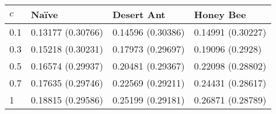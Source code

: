 \begin{tabular} {|l|l|l|l|}
\hline
$c$ & Na\"ive & Desert Ant & Honey Bee \\
\hline
0.1 & 0.13177 (0.30766) & 0.14596 (0.30386)  & 0.14991 (0.30227)    \\
0.3 & 0.15218 (0.30231) & 0.17973 (0.29697)  & 0.19096 (0.2928)     \\
0.5 & 0.16574 (0.29937) & 0.20481 (0.29367)  & 0.22098 (0.28802)    \\
0.7 & 0.17635 (0.29746) & 0.22569 (0.29211)  & 0.24431 (0.28617)    \\
1   & 0.18815 (0.29586) & 0.25199 (0.29181)  & 0.26871 (0.28789)    \\
\hline
\end{tabular}